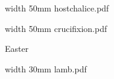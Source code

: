 \centerline{\useimageresource \lastsavedimageresourceindex}



\bigskip

\eject


\bigskip

\saveimageresource width 50mm {hostchalice.pdf}

\centerline{\useimageresource \lastsavedimageresourceindex}



\bigskip

\eject


\paginaproxima


\bigskip

\saveimageresource width 50mm {crucifixion.pdf}

\centerline{\useimageresource \lastsavedimageresourceindex}



\bigskip

\eject

\beginpart Easter


\bigskip


\eject


\bigskip


\eject


\bigskip



\bigskip

\saveimageresource width 30mm {lamb.pdf}

\centerline{\useimageresource \lastsavedimageresourceindex}



